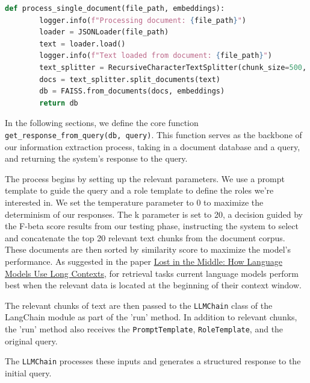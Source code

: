 \documentclass{article}
\begin{document}
\begin{lstlisting}[language=Python, caption=Code Snippet 3, breaklines=true]
    def process_single_document(file_path, embeddings):
        logger.info(f"Processing document: {file_path}")
        loader = JSONLoader(file_path)
        text = loader.load()
        logger.info(f"Text loaded from document: {file_path}")
        text_splitter = RecursiveCharacterTextSplitter(chunk_size=500, chunk_overlap=250)
        docs = text_splitter.split_documents(text)
        db = FAISS.from_documents(docs, embeddings)
        return db
\end{lstlisting}

In the following sections, we define the core function \texttt{get\_response\_from\_query(db, query)}. This function serves as the backbone of our information extraction process, taking in a document database and a query, and returning the system's response to the query. 

The process begins by setting up the relevant parameters. We use a prompt template to guide the query and a role template to define the roles we're interested in. We set the temperature parameter to 0 to maximize the determinism of our responses. The k parameter is set to 20, a decision guided by the F-beta score results from our testing phase, instructing the system to select and concatenate the top 20 relevant text chunks from the document corpus. These documents are then sorted by similarity score to maximize the model's performance. As suggested in the paper \href{https://arxiv.org/abs/2307.03172}{Lost in the Middle: How Language Models Use Long Contexts}, for retrieval tasks current language models perform best when the relevant data is located at the beginning of their context window.

The relevant chunks of text are then passed to the \texttt{LLMChain} class of the LangChain module as part of the 'run' method. In addition to relevant chunks, the 'run' method also receives the \texttt{PromptTemplate}, \texttt{RoleTemplate}, and the original query.

The \texttt{LLMChain} processes these inputs and generates a structured response to the initial query.
\end{document}
